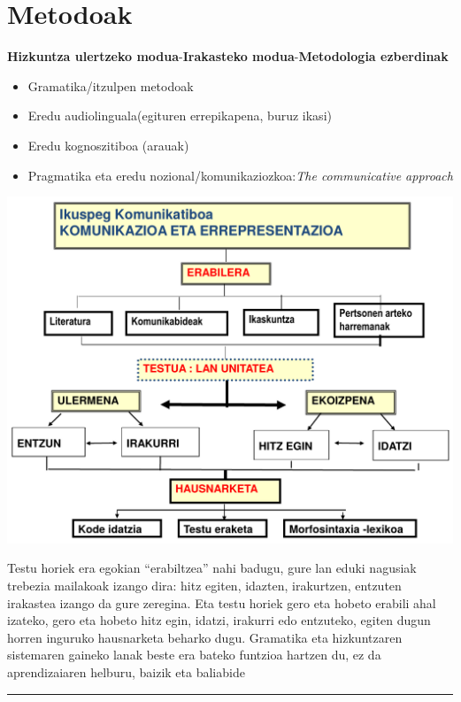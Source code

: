 \documentclass[
]{book}
\providecommand{\tightlist}{%
  \setlength{\itemsep}{0pt}\setlength{\parskip}{0pt}}
\begin{document}
\hypertarget{metodoak}{%
\section{Metodoak}\label{metodoak}}

\textbf{Hizkuntza ulertzeko modua}-\textbf{Irakasteko modua}-\textbf{Metodologia ezberdinak}

\begin{itemize}
\tightlist
\item
  Gramatika/itzulpen metodoak
\item
  Eredu audiolinguala(egituren errepikapena, buruz ikasi)
\item
  Eredu kognoszitiboa (arauak)
\item
  Pragmatika eta eredu nozional/komunikaziozkoa:\emph{The communicative approach}
\end{itemize}

\includegraphics{assets/01_03-HD.png}

Testu horiek era egokian ``erabiltzea'' nahi badugu, gure lan eduki nagusiak trebezia mailakoak izango dira: hitz egiten, idazten, irakurtzen, entzuten irakastea izango da gure zeregina.
Eta testu horiek gero eta hobeto erabili ahal izateko, gero eta hobeto hitz egin, idatzi, irakurri edo entzuteko, egiten dugun horren inguruko hausnarketa beharko dugu. Gramatika eta hizkuntzaren sistemaren gaineko lanak beste era bateko funtzioa hartzen du, ez da aprendizaiaren helburu, baizik eta baliabide

\begin{center}\rule{0.5\linewidth}{0.5pt}\end{center}
\end{document}
